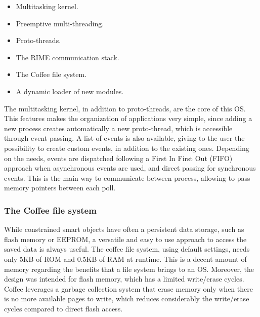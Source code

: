 \begin{itemize}
	\item Multitasking kernel.
	\item Preemptive multi-threading.
	\item Proto-threads\cite{dunkels2006protothreads}.
	\item The RIME communication stack\cite{dunkels2007rime}.
	\item The Coffee file system\cite{tsiftes09enabling}.
	\item A dynamic loader of new modules\cite{dunkels06runtime}.
\end{itemize}

The multitasking kernel, in addition to proto-threads, are the core of this OS.
This features makes the organization of applications very simple, since adding a new process creates automatically a new proto-thread, which is accessible through event-passing.
A list of events is also available, giving to the user the possibility to create custom events, in addition to the existing ones.
Depending on the needs, events are dispatched following a First In First Out (FIFO) approach when asynchronous events are used, and direct passing for synchronous events.
This is the main way to communicate between process, allowing to pass memory pointers between each poll.

\subsubsection{The Coffee file system}
While constrained smart objects have often a persistent data storage, such as flash memory or EEPROM, a versatile and easy to use approach to access the saved data is always useful.
The coffee file system, using default settings, needs only 5KB of ROM and 0.5KB of RAM at runtime.
This is a decent amount of memory regarding the benefits that a file system brings to an OS.
Moreover, the design was intended for flash memory, which has a limited write/erase cycles.
Coffee leverages a garbage collection system that erase memory only when there is no more available pages to write, which reduces considerably the write/erase cycles compared to direct flash access.

